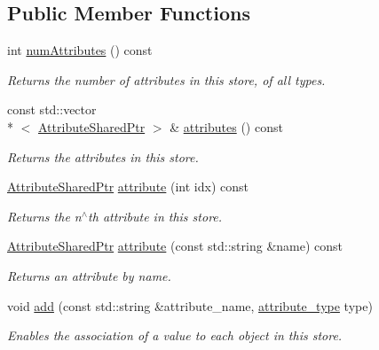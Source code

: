 \subsection*{Public Member Functions}
\begin{DoxyCompactItemize}
\item 
int \hyperlink{classmlnet_1_1_attribute_store_a2c9be1aeffdebae76fc5abbd4f29ba49}{num\+Attributes} () const 
\begin{DoxyCompactList}\small\item\em Returns the number of attributes in this store, of all types. \end{DoxyCompactList}\item 
const std\+::vector\\*
$<$ \hyperlink{namespacemlnet_a760c8b8d6997e73350446bafff35e6d6}{Attribute\+Shared\+Ptr} $>$ \& \hyperlink{classmlnet_1_1_attribute_store_a6b1e02fe4782c546c69b8744e87cc715}{attributes} () const 
\begin{DoxyCompactList}\small\item\em Returns the attributes in this store. \end{DoxyCompactList}\item 
\hyperlink{namespacemlnet_a760c8b8d6997e73350446bafff35e6d6}{Attribute\+Shared\+Ptr} \hyperlink{classmlnet_1_1_attribute_store_abbb1d1393d05c7b9f50d24c99dab8313}{attribute} (int idx) const 
\begin{DoxyCompactList}\small\item\em Returns the n$^\wedge$th attribute in this store. \end{DoxyCompactList}\item 
\hyperlink{namespacemlnet_a760c8b8d6997e73350446bafff35e6d6}{Attribute\+Shared\+Ptr} \hyperlink{classmlnet_1_1_attribute_store_ab0a0e35a31e28573d3ec6292fa095acc}{attribute} (const std\+::string \&name) const 
\begin{DoxyCompactList}\small\item\em Returns an attribute by name. \end{DoxyCompactList}\item 
void \hyperlink{classmlnet_1_1_attribute_store_a9dbc93ccd1fd33d51cbad05aeee65ed0}{add} (const std\+::string \&attribute\+\_\+name, \hyperlink{namespacemlnet_a8bd10c6e8e4d27ef4d974b3f576a3a06}{attribute\+\_\+type} type)
\begin{DoxyCompactList}\small\item\em Enables the association of a value to each object in this store. \end{DoxyCompactList}\item 

\end{DoxyCompactItemize}
